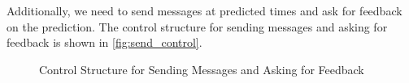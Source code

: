Additionally, we need to send messages at predicted times and ask for feedback on the prediction.
The control structure for sending messages and asking for feedback is shown in \autoref{fig:send_control}.

\begin{figure}[htbp]
  \centering
  \caption[Control Structure for Sending Messages and Asking for Feedback]{Control Structure for Sending Messages and Asking for Feedback}
  \label{fig:send_control}
\end{figure}

